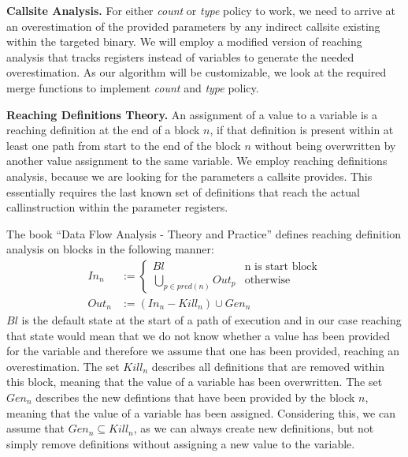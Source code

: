 \textbf{Callsite Analysis.}
\label{section:callsiteanalysis}
For either \emph{count} or \emph{type} policy to work, we need to arrive at an overestimation of the provided parameters by any indirect callsite existing within the targeted binary. We will employ a modified version of reaching analysis that tracks registers instead of variables to generate the needed overestimation. As our algorithm will be customizable, we look at the required merge functions to implement \emph{count} and \emph{type} policy. 

\textbf{Reaching Definitions Theory.}
\label{subsection:reachindefinitionstheory}
An assignment of a value to a variable is a reaching definition at the end of a block $n$, if that definition is present within at least one path from start to the end of the block $n$ without being overwritten by another value assignment to the same variable. We employ reaching definitions analysis, because we are looking for the parameters a callsite provides. This essentially requires the last known set of definitions that reach the actual callinstruction within the parameter registers.

The book ``Data Flow Analysis - Theory and Practice'' \cite{khedker2009data} defines reaching definition analysis on blocks in the following manner:
\begin{subequations}
\label{eq:reachingbasedef}
\begin{align}
In_n &:= \left\{
  \begin{array}{lr}
    Bl & \text{n is start block}\\
    \underset{p \in pred(n)}{\bigcup} Out_p & \text{otherwise}
  \end{array}
\right. \label{eq:reachingbasedefInt}\\
Out_n &:= (In_n - Kill_n) \cup Gen_n \label{eq:reachingbasedefOut}
\end{align}
\end{subequations}
$Bl$ is the default state at the start of a path of execution and in our case reaching that state would mean that we do not know whether a value has been provided for the variable and therefore we assume that one has been provided, reaching an overestimation. The set $Kill_n$ describes all definitions that are removed within this block, meaning that the value of a variable has been overwritten. The set $Gen_n$ describes the new defintions that have been provided by the block $n$, meaning that the value of a variable has been assigned. Considering this, we can assume that $Gen_n \subseteq Kill_n$, as we can always create new definitions, but not simply remove definitions without assigning a new value to the variable.

